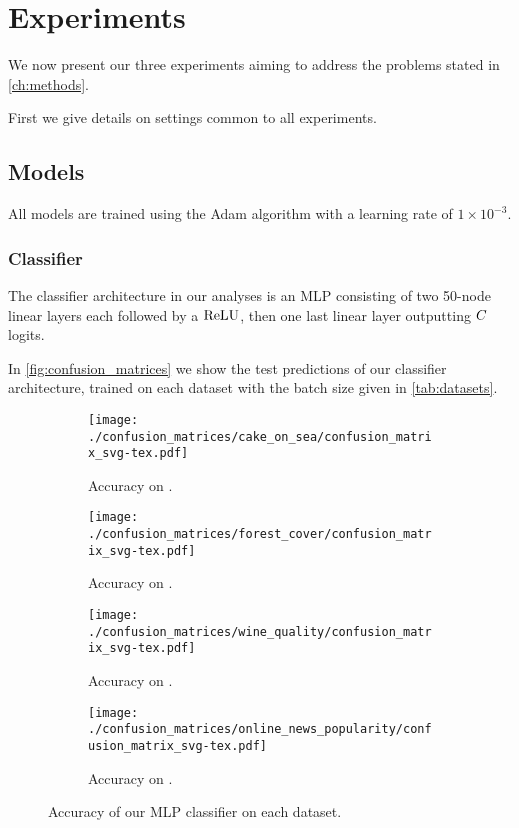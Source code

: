 \documentclass[../main.tex]{subfiles}
\begin{document}
\chapter{Experiments}

We now present our three experiments aiming to address the problems stated in \autoref{ch:methods}.

First we give details on settings common to all experiments.

\section{Models}

All models are trained using the Adam algorithm \cite{kingmaAdam2014} with a learning rate of $1 \times 10^{-3}$.

\subsection{Classifier}
\label{exp/classifiers}

The classifier architecture in our analyses is an MLP consisting of two 50-node linear layers each followed by a $\text{ReLU}$, then one last linear layer outputting $C$ logits.

In \autoref{fig:confusion_matrices} we show the test predictions of our classifier architecture, trained on each dataset with the batch size given in \autoref{tab:datasets}.
\begin{figure}
    \centering
    \begin{subfigure}[b]{0.4\textwidth}
        \centering
        \texttt{[image: ./confusion\_matrices/cake\_on\_sea/confusion\_matrix\_svg-tex.pdf]}
        \caption{Accuracy on \CakeOnSea.}
\label{fig:cos_confusion_matrix}
    \end{subfigure}
    \begin{subfigure}[b]{0.4\textwidth}
        \centering
        \texttt{[image: ./confusion\_matrices/forest\_cover/confusion\_matrix\_svg-tex.pdf]}
        \caption{Accuracy on \ForestCover.}
    \end{subfigure}

    \begin{subfigure}[b]{0.4\textwidth}
        \centering
        \texttt{[image: ./confusion\_matrices/wine\_quality/confusion\_matrix\_svg-tex.pdf]}
        \caption{Accuracy on \WineQuality.}
    \end{subfigure}
    \begin{subfigure}[b]{0.4\textwidth}
        \centering
        \texttt{[image: ./confusion\_matrices/online\_news\_popularity/confusion\_matrix\_svg-tex.pdf]}
        \caption{Accuracy on \OnlineNewsPopularity.}
    \end{subfigure}

    \caption{Accuracy of our MLP classifier on each dataset.}
    \label{fig:confusion_matrices}
\end{figure}
\end{document}

